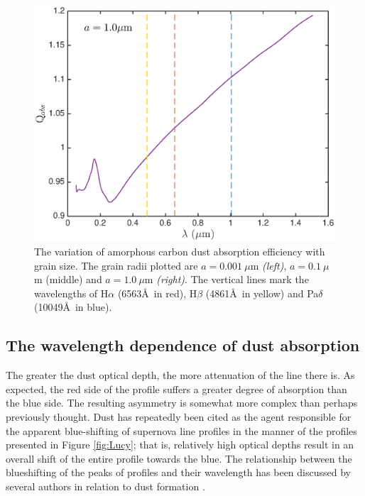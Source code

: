 \documentclass[useAMS,usenatbib,usegraphicx]{mnras}
\begin{document}
\begin{figure}
\includegraphics[trim =20 0 5 0,clip=true,scale=0.33]{Qabs_a1_0}
\caption{The variation of amorphous carbon dust absorption efficiency with grain size. The grain radii plotted are $a=0.001~\mu$m \textit{(left)}, $a=0.1~\mu$m (middle) and $a=1.0~\mu$m \textit{(right)}.  The vertical lines mark the wavelengths of H$\alpha$ (6563\AA\ in red), H$\beta$ (4861\AA\ in yellow) and Pa$\delta$ (10049\AA\ in blue).}
\label{wav_dep2}
\end{figure}






\subsection{The wavelength dependence of dust absorption}
\label{asym}

The greater the dust optical depth, the more attenuation of the line 
there is.  As expected, the red side of the profile suffers a greater 
degree of absorption than the blue side.  The resulting asymmetry is 
somewhat more complex than perhaps previously thought.  Dust has 
repeatedly been cited as the agent responsible for the apparent 
blue-shifting of supernova line profiles in the manner of the profiles 
presented in Figure \ref{fig:Lucy}; that is, relatively high optical 
depths result in an overall shift of the entire profile towards the blue.
 The relationship between the blueshifting of the peaks 
of profiles and their wavelength has been discussed by several authors in 
relation to dust formation \citep{Smith2012, Fransson2014, Gall2014}.  
  
\end{document}
